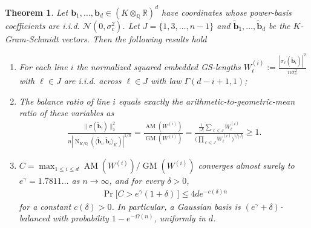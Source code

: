 \documentclass[11pt,a4paper]{article}
\theoremstyle{plain}
\newtheorem{theorem}{Theorem}[section]
\theoremstyle{definition}
\theoremstyle{remark}
\DeclareMathOperator{\Nm}{N}
\newcommand{\Q}{\mathbb{Q}}
\newcommand{\R}{\mathbb{R}}
\begin{document}
\begin{theorem}
\label{T:gaussbalance}
Let $\mathbf{b}_1, \dots, \mathbf{b}_d\in (K\otimes_\Q\R)^d$ have coordinates whose power-basis coefficients are i.i.d. $\mathcal{N}(0,\sigma_c^2)$. Let $J=\{1, 3, \dots, n-1\}$ and $\tilde{\mathbf{b}}_1, \dots, \tilde{\mathbf{b}}_d$ be the $K$-Gram-Schmidt vectors. Then the following results hold 
\begin{enumerate}[label=(\roman*),nosep]
\item For each line $i$ the normalized squared embedded GS-lengths
$W^{(i)}_\ell:=\tfrac{|\sigma_\ell(\tilde{\mathbf{b}}_i)|^2}{n\sigma_c^2}$ with $\ell\in J$ are i.i.d. across $\ell\in J$ with law $\Gamma(d-i+1, 1)$;

\item The balance ratio of line $i$ equals exactly the arithmetic-to-geometric-mean ratio of these variables as
\begin{align}
  \frac{\|\sigma(\tilde{\mathbf{b}}_i)\|_2^2}{n|\Nm_{K/\Q}(\langle\tilde{\mathbf{b}}_i, \tilde{\mathbf{b}}_i\rangle_K)|^{1/n}}
=\frac{\operatorname{AM}(W^{(i)})}{\operatorname{GM}(W^{(i)})} =\frac{\tfrac1{|J|}\sum_{\ell\in J}W^{(i)}_\ell}        {\bigl(\prod_{\ell\in J}W^{(i)}_\ell\bigr)^{1/|J|}} \ge 1 .
   \label{E:amgm}
\end{align}
\item $C=\max_{1\le i\le d}\operatorname{AM}(W^{(i)})/\operatorname{GM}(W^{(i)})$ converges almost surely to $e^{\gamma}=1.7811\ldots$ as $n\to\infty$, and for every $\delta>0$, 
\begin{align}
  \Pr\bigl[C> e^{\gamma}(1+\delta)\,\bigr]\le 4d e^{-c(\delta) n}
\end{align}
for a constant $c(\delta)>0$. In particular, a Gaussian basis is $(e^{\gamma}+\delta)$-balanced with probability $1-e^{-\Omega(n)}$, uniformly in $d$.
\end{enumerate}

\end{theorem}
\end{document}
